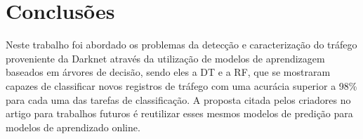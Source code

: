 \section{Conclusões}

Neste trabalho foi abordado os problemas da detecção e caracterização do tráfego proveniente da 
Darknet através da utilização de modelos de aprendizagem baseados em árvores de decisão, sendo 
eles a DT e a RF, que se mostraram capazes de classificar novos registros de tráfego com uma 
acurácia superior a 98\% para cada uma das tarefas de classificação. A proposta citada pelos
criadores no artigo para trabalhos futuros é reutilizar esses mesmos modelos de predição para 
modelos de aprendizado online.